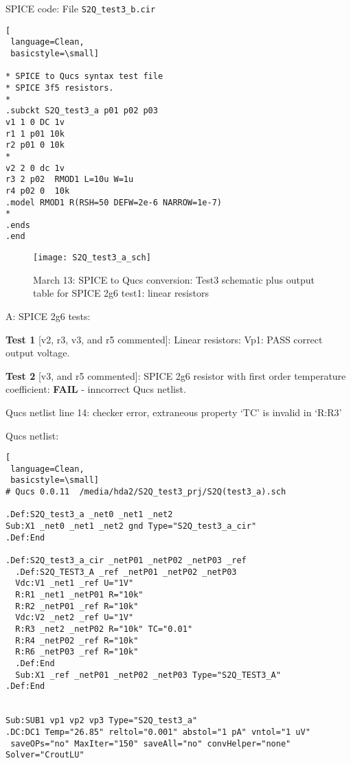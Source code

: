 \newpage 
\begin{flushleft}

SPICE code: File \verb|S2Q_test3_b.cir|

\end{flushleft}

\begin{lstlisting}[
 language=Clean, 
 basicstyle=\small]

* SPICE to Qucs syntax test file 
* SPICE 3f5 resistors.
*
.subckt S2Q_test3_a p01 p02 p03
v1 1 0 DC 1v
r1 1 p01 10k
r2 p01 0 10k
*
v2 2 0 dc 1v
r3 2 p02  RMOD1 L=10u W=1u
r4 p02 0  10k
.model RMOD1 R(RSH=50 DEFW=2e-6 NARROW=1e-7)
*
.ends
.end
\end{lstlisting}


\begin{flushleft}
 

\end{flushleft}

\begin{figure}
  \centering
  \texttt{[image: S2Q\_test3\_a\_sch]}
  \caption{March 13: SPICE to Qucs conversion: Test3 schematic plus output table for SPICE 2g6 test1: linear resistors}
  \label{fig:S2Qtest3_1}
\end{figure} 
 
\begin{flushleft}

\newpage 
{}

A: SPICE 2g6 tests:



\textbf{Test 1} [v2, r3, v3, and r5 commented]: Linear resistors: Vp1: PASS correct output voltage.


\textbf{Test 2} [v3, and r5  commented]: SPICE 2g6 resistor with first order temperature coefficient:\textbf{ FAIL} - inncorrect Qucs netlist.


Qucs netlist line 14: checker error, extraneous property `TC' is invalid in `R:R3'


 
\end{flushleft}


Qucs netlist:
\begin{lstlisting}[
 language=Clean, 
 basicstyle=\small]
# Qucs 0.0.11  /media/hda2/S2Q_test3_prj/S2Q(test3_a).sch

.Def:S2Q_test3_a _net0 _net1 _net2
Sub:X1 _net0 _net1 _net2 gnd Type="S2Q_test3_a_cir"
.Def:End

.Def:S2Q_test3_a_cir _netP01 _netP02 _netP03 _ref
  .Def:S2Q_TEST3_A _ref _netP01 _netP02 _netP03
  Vdc:V1 _net1 _ref U="1V"
  R:R1 _net1 _netP01 R="10k"
  R:R2 _netP01 _ref R="10k"
  Vdc:V2 _net2 _ref U="1V"
  R:R3 _net2 _netP02 R="10k" TC="0.01"
  R:R4 _netP02 _ref R="10k"
  R:R6 _netP03 _ref R="10k"
  .Def:End
  Sub:X1 _ref _netP01 _netP02 _netP03 Type="S2Q_TEST3_A"
.Def:End


Sub:SUB1 vp1 vp2 vp3 Type="S2Q_test3_a"
.DC:DC1 Temp="26.85" reltol="0.001" abstol="1 pA" vntol="1 uV"
 saveOPs="no" MaxIter="150" saveAll="no" convHelper="none" Solver="CroutLU"
\end{lstlisting}

